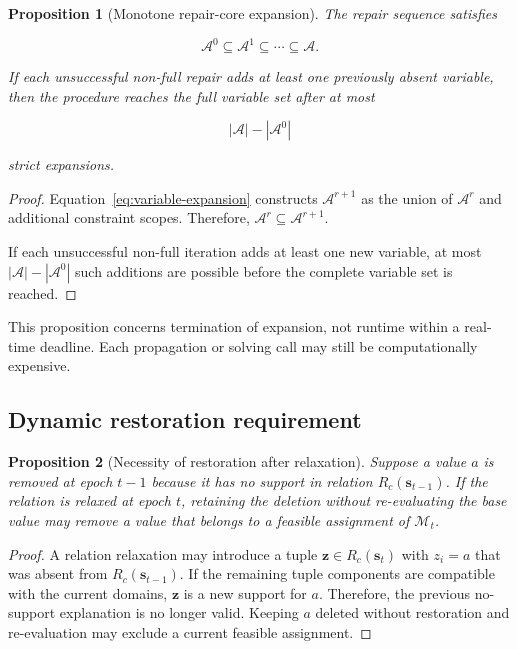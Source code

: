 \documentclass[pdflatex,sn-mathphys-num,iicol,oneside]{sn-jnl}
\newtheorem{proposition}{Proposition}
\begin{document}
\begin{proposition}[Monotone repair-core expansion]
The repair sequence satisfies

\begin{equation}
\mathcal{A}^{0}
\subseteq
\mathcal{A}^{1}
\subseteq
\cdots
\subseteq
\mathcal{A}.
\end{equation}

If each unsuccessful non-full repair adds at least one previously
absent variable, then the procedure reaches the full variable set
after at most

\begin{equation}
|\mathcal{A}|-|\mathcal{A}^{0}|
\end{equation}

strict expansions.
\end{proposition}

\begin{proof}
Equation~\eqref{eq:variable-expansion} constructs
$\mathcal{A}^{r+1}$ as the union of $\mathcal{A}^{r}$ and additional
constraint scopes. Therefore,
$\mathcal{A}^{r}\subseteq\mathcal{A}^{r+1}$.

If each unsuccessful non-full iteration adds at least one new
variable, at most
$|\mathcal{A}|-|\mathcal{A}^{0}|$ such additions are possible before
the complete variable set is reached.
\end{proof}

This proposition concerns termination of expansion, not runtime
within a real-time deadline. Each propagation or solving call may
still be computationally expensive.

\subsection{Dynamic restoration requirement}

\begin{proposition}[Necessity of restoration after relaxation]
Suppose a value $a$ is removed at epoch $t-1$ because it has no
support in relation $R_c(\bm{s}_{t-1})$. If the relation is relaxed at
epoch $t$, retaining the deletion without re-evaluating the base value
may remove a value that belongs to a feasible assignment of
$\mathcal{M}_t$.
\end{proposition}

\begin{proof}
A relation relaxation may introduce a tuple
$\bm{z}\in R_c(\bm{s}_t)$ with $z_i=a$ that was absent from
$R_c(\bm{s}_{t-1})$. If the remaining tuple components are compatible
with the current domains, $\bm{z}$ is a new support for $a$.
Therefore, the previous no-support explanation is no longer valid.
Keeping $a$ deleted without restoration and re-evaluation may exclude
a current feasible assignment.
\end{proof}
\end{document}
